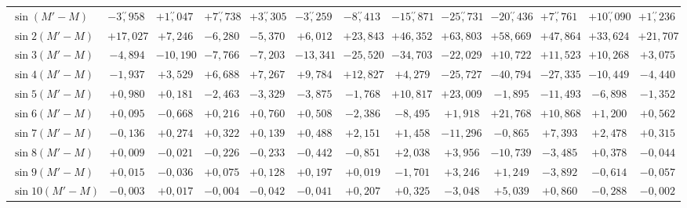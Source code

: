 \begin{landscape}
\begin{longtable}{@{}l|r|r|r|r|r|r|r|r|r|r|r|r@{}}
\hline
\endhead
\(\sin(M'-M)\) & \(-3\overset{\prime\prime}{,}958\) & \(+1\overset{\prime\prime}{,}047\) & \(+7\overset{\prime\prime}{,}738\) & \(+3\overset{\prime\prime}{,}305\) & \(-3\overset{\prime\prime}{,}259\) & \(-8\overset{\prime\prime}{,}413\) & \(-15\overset{\prime\prime}{,}871\) & \(-25\overset{\prime\prime}{,}731\) & \(-20\overset{\prime\prime}{,}436\) & \(+7\overset{\prime\prime}{,}761\) & \(+10\overset{\prime\prime}{,}090\) & \(+1\overset{\prime\prime}{,}236\)\\
\(\sin 2(M'-M)\) & \(+17{,}027\) & \(+7{,}246\) & \(-6{,}280\) & \(-5{,}370\) & \(+6{,}012\) & \(+23{,}843\) & \(+46{,}352\) & \(+63{,}803\) & \(+58{,}669\) & \(+47{,}864\) & \(+33{,}624\) & \(+21{,}707\)\\
\(\sin 3(M'-M)\) & \(-4{,}894\) & \(-10{,}190\) & \(-7{,}766\) & \(-7{,}203\) & \(-13{,}341\) & \(-25{,}520\) & \(-34{,}703\) & \(-22{,}029\) & \(+10{,}722\) & \(+11{,}523\) & \(+10{,}268\) & \(+3{,}075\)\\
\(\sin 4(M'-M)\) & \(-1{,}937\) & \(+3{,}529\) & \(+6{,}688\) & \(+7{,}267\) & \(+9{,}784\) & \(+12{,}827\) & \(+4{,}279\) & \(-25{,}727\) & \(-40{,}794\) & \(-27{,}335\) & \(-10{,}449\) & \(-4{,}440\)\\
\(\sin 5(M'-M)\) & \(+0{,}980\) & \(+0{,}181\) & \(-2{,}463\) & \(-3{,}329\) & \(-3{,}875\) & \(-1{,}768\) & \(+10{,}817\) & \(+23{,}009\) & \(-1{,}895\) & \(-11{,}493\) & \(-6{,}898\) & \(-1{,}352\)\\
\(\sin 6(M'-M)\) & \(+0{,}095\) & \(-0{,}668\) & \(+0{,}216\) & \(+0{,}760\) & \(+0{,}508\) & \(-2{,}386\) & \(-8{,}495\) & \(+1{,}918\) & \(+21{,}768\) & \(+10{,}868\) & \(+1{,}200\) & \(+0{,}562\)\\
\(\sin 7(M'-M)\) & \(-0{,}136\) & \(+0{,}274\) & \(+0{,}322\) & \(+0{,}139\) & \(+0{,}488\) & \(+2{,}151\) & \(+1{,}458\) & \(-11{,}296\) & \(-0{,}865\) & \(+7{,}393\) & \(+2{,}478\) & \(+0{,}315\)\\
\(\sin 8(M'-M)\) & \(+0{,}009\) & \(-0{,}021\) & \(-0{,}226\) & \(-0{,}233\) & \(-0{,}442\) & \(-0{,}851\) & \(+2{,}038\) & \(+3{,}956\) & \(-10{,}739\) & \(-3{,}485\) & \(+0{,}378\) & \(-0{,}044\)\\
\(\sin 9(M'-M)\) & \(+0{,}015\) & \(-0{,}036\) & \(+0{,}075\) & \(+0{,}128\) & \(+0{,}197\) & \(+0{,}019\) & \(-1{,}701\) & \(+3{,}246\) & \(+1{,}249\) & \(-3{,}892\) & \(-0{,}614\) & \(-0{,}057\)\\
\(\sin 10(M'-M)\) & \(-0{,}003\) & \(+0{,}017\) & \(-0{,}004\) & \(-0{,}042\) & \(-0{,}041\) & \(+0{,}207\) & \(+0{,}325\) & \(-3{,}048\) & \(+5{,}039\) & \(+0{,}860\) & \(-0{,}288\) & \(-0{,}002\)\\

\end{longtable}
\end{landscape}

